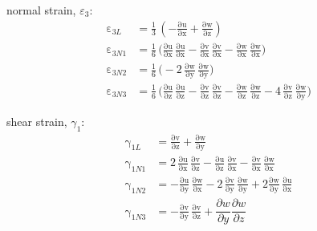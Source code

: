 normal strain, $\varepsilon_3$:
\begin{subequations}
	\begin{align}
	\mathrm \varepsilon_{3L} & = \frac{1}{3} \, \left(-\mathrm{\frac{\partial u}{\partial x}} + \mathrm{\frac{\partial w}{\partial z}}\right)\\
	\mathrm \varepsilon_{3N1} & = \frac{1}{6} \, \Big(\mathrm{\frac{ \partial u}{\partial x}}\, \mathrm{\frac{ \partial u}{\partial x}}	- \mathrm{\frac{\partial v}{\partial x}}\, \mathrm{\frac{\partial v}{\partial x}}- \mathrm{\frac{\partial w}{\partial x}}\, \mathrm{\frac{\partial w}{\partial x}}\Big)\\
	\mathrm \varepsilon_{3N2} & = \frac{1}{6} \, \Big( - 2 \,  \mathrm{\frac{\partial w}{\partial y}}\, \mathrm{\frac{\partial w}{\partial y}}\Big)\\
	\mathrm \varepsilon_{3N3} & = \frac{1}{6} \, \Big(\mathrm{\frac{\partial u}{\partial z}}\, \mathrm{\frac{\partial u}{\partial z}} - \mathrm{\frac{\partial v}{\partial z}}\, \mathrm{\frac{\partial v}{\partial z}} -  \mathrm{\frac{\partial w}{\partial z}}\, \mathrm{\frac{\partial w}{\partial z}} - 4 \, \mathrm{\frac{\partial v}{\partial z}}\, \mathrm{\frac{\partial w}{\partial y}}\Big)
	\end{align}
\end{subequations}

shear strain, $\gamma_1$:
\begin{subequations}
	\begin{align}
	\mathrm \gamma_{1L} & = \mathrm{\frac{\partial v}{\partial z}} + \mathrm{\frac{\partial w}{\partial y}}\\
	\mathrm \gamma_{1N1} & = 2 \, \mathrm{\frac{\partial u}{\partial x}}\, \mathrm{\frac{\partial v}{\partial z}}	 - \mathrm{\frac{ \partial u}{\partial z}}\, \mathrm{\frac{ \partial v}{\partial x}}-   \mathrm{\frac{\partial v}{\partial x}}\, \mathrm{\frac{\partial w}{\partial x}}\\
	\mathrm \gamma_{1N2} & = - \mathrm{\frac{\partial u}{\partial y}}\, \mathrm{\frac{\partial w}{\partial x}} - 2 \, \mathrm{\frac{\partial v}{\partial y}}\, \mathrm{\frac{\partial w}{\partial y}} + 2 \mathrm{\frac{\partial w}{\partial y}}\, \mathrm{\frac{\partial u}{\partial x}}\\
	\mathrm \gamma_{1N3} & = - \mathrm{\frac{\partial v}{\partial y}}\, \mathrm{\frac{\partial v}{\partial z}} + \dfrac{\partial w}{\partial y} \dfrac{\partial w}{\partial z}
	\end{align}
\end{subequations}

